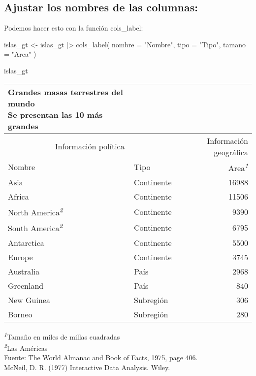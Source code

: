 \documentclass[
]{article}
\newenvironment{Shaded}{\begin{snugshade}}{\end{snugshade}}
\newcommand{\AttributeTok}[1]{\textcolor[rgb]{0.77,0.63,0.00}{#1}}
\newcommand{\FunctionTok}[1]{\textcolor[rgb]{0.00,0.00,0.00}{#1}}
\newcommand{\NormalTok}[1]{#1}
\newcommand{\OtherTok}[1]{\textcolor[rgb]{0.56,0.35,0.01}{#1}}
\newcommand{\SpecialCharTok}[1]{\textcolor[rgb]{0.00,0.00,0.00}{#1}}
\newcommand{\StringTok}[1]{\textcolor[rgb]{0.31,0.60,0.02}{#1}}
\begin{document}
\hypertarget{ajustar-los-nombres-de-las-columnas}{%
\subsection{Ajustar los nombres de las
columnas:}\label{ajustar-los-nombres-de-las-columnas}}

Podemos hacer esto con la función cols\_label:

\begin{Shaded}
\begin{Highlighting}[]
\NormalTok{islas\_gt }\OtherTok{\textless{}{-}}\NormalTok{ islas\_gt }\SpecialCharTok{|\textgreater{}} 
  \FunctionTok{cols\_label}\NormalTok{(}
    \AttributeTok{nombre =} \StringTok{"Nombre"}\NormalTok{,}
    \AttributeTok{tipo =} \StringTok{"Tipo"}\NormalTok{,}
    \AttributeTok{tamano =} \StringTok{"Area"}
\NormalTok{  )}

\NormalTok{islas\_gt}
\end{Highlighting}
\end{Shaded}

\setlength{\LTpost}{0mm}
\begin{longtable}{llr}
\caption*{
{\large Grandes masas terrestres del mundo} \\ 
{\small Se presentan las 10 más grandes}
} \\ 
\toprule
\multicolumn{2}{c}{Información política} & Información geográfica \\ 
\cmidrule(lr){1-2} \cmidrule(lr){3-3}
Nombre & Tipo & Area\textsuperscript{\textit{1}} \\ 
\midrule
Asia & Continente & 16988 \\ 
Africa & Continente & 11506 \\ 
North America\textsuperscript{\textit{2}} & Continente & 9390 \\ 
South America\textsuperscript{\textit{2}} & Continente & 6795 \\ 
Antarctica & Continente & 5500 \\ 
Europe & Continente & 3745 \\ 
Australia & País & 2968 \\ 
Greenland & País & 840 \\ 
New Guinea & Subregión & 306 \\ 
Borneo & Subregión & 280 \\ 
\bottomrule
\end{longtable}
\begin{minipage}{\linewidth}
\textsuperscript{\textit{1}}Tamaño en miles de millas cuadradas\\
\textsuperscript{\textit{2}}Las Américas\\
Fuente: The World Almanac and Book of Facts, 1975, page 406.\\
McNeil, D. R. (1977) Interactive Data Analysis. Wiley.\\
\end{minipage}
\end{document}
